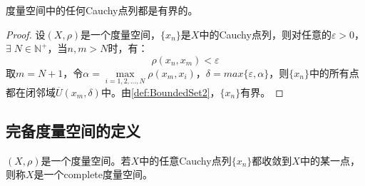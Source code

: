 \begin{theorem}
	度量空间中的任何Cauchy点列都是有界的。
\end{theorem}
\begin{proof}
	设$(X,\rho)$是一个度量空间，$\{x_n\}$是$X$中的Cauchy点列，则对任意的$\varepsilon>0$，$\exists\;N\in\mathbb{N}^+$，当$n,m>N$时，有：
	\begin{equation*}
		\rho(x_n,x_m)<\varepsilon
	\end{equation*}
	取$m=N+1$，令$\alpha=\max\limits_{i=1,2,\dots,N}\rho(x_m,x_i)$，$\delta=max\{\varepsilon,\alpha\}$，则$\{x_n\}$中的所有点都在闭邻域$\overline{U}(x_m,\delta)$中。由\cref{def:BoundedSet2}，$\{x_n\}$有界。
\end{proof}

\subsection{完备度量空间的定义}
\begin{definition}
	$(X,\rho)$是一个度量空间。若$X$中的任意Cauchy点列$\{x_n\}$都收敛到$X$中的某一点，则称$X$是一个\gls{complete}度量空间。
\end{definition}
